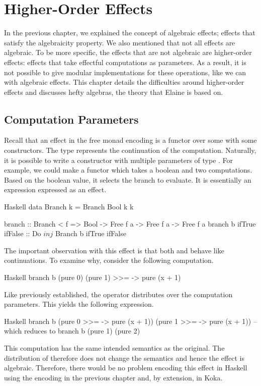 \chapter{Higher-Order Effects}\label{chap:higher_order}

In the previous chapter, we explained the concept of algebraic effects; effects that satisfy the algebraicity property. We also mentioned that not all effects are algebraic. To be more specific, the effects that are not algebraic are higher-order effects: effects that take effectful computations as parameters. As a result, it is not possible to give modular implementations for these operations, like we can with algebraic effects. This chapter details the difficulties around higher-order effects and discusses hefty algebras, the theory that Elaine is based on.


\section{Computation Parameters}

Recall that an effect in the free monad encoding is a functor over some  with some constructors. The type  represents the continuation of the computation. Naturally, it is possible to write a constructor with multiple parameters of type . For example, we could make a  functor which takes a boolean and two computations. Based on the boolean value, it selects the branch to evaluate. It is essentially an  expression expressed as an effect.

\begin{lst}{Haskell}
data Branch k = Branch Bool k k

branch :: Branch < f => Bool -> Free f a -> Free f a -> Free f a
branch b ifTrue ifFalse :: Do $ inj $ Branch b ifTrue ifFalse
\end{lst}
%
The important observation with this effect is that both  and  behave like continuations. To examine why, consider the following computation.

\begin{lst}{Haskell}
branch b (pure 0) (pure 1) >>= \x -> pure (x + 1)
\end{lst}
%
Like previously established, the \hs{>>=} operator distributes over the computation parameters. This yields the following expression.

\begin{lst}{Haskell}
branch b
  (pure 0 >>= \x -> pure (x + 1))
  (pure 1 >>= \x -> pure (x + 1))
-- which reduces to
branch b (pure 1) (pure 2)
\end{lst}
%
This computation has the same intended semantics as the original. The distribution of \hs{>>=} therefore does not change the semantics and hence the effect is algebraic. Therefore, there would be no problem encoding this effect in Haskell using the encoding in the previous chapter and, by extension, in Koka.

